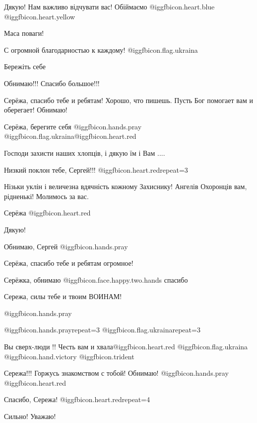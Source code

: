 \begin{itemize}
Дякую! Нам важливо відчувати вас! Обіймаємо @igg{fbicon.heart.blue}  @igg{fbicon.heart.yellow} 

Маса поваги!

С огромной благодарностью к каждому! @igg{fbicon.flag.ukraina}

Бережіть себе

Обнимаю!!! Спасибо большое!!!

Серёжа, спасибо тебе и ребятам! Хорошо, что пишешь. Пусть Бог помогает вам и оберегает! Обнимаю!

Серёжа, берегите себя  @igg{fbicon.hands.pray} @igg{fbicon.flag.ukraina}@igg{fbicon.heart.red}

Господи захисти наших хлопців, і дякую їм і Вам ....

Низкий поклон тебе, Сергей!!! @igg{fbicon.heart.red}{repeat=3}

Нізьки уклін і величезна вдячність кожному Захиснику! Ангелів Охоронців вам, рідненькі! Молимось за вас.

Серёжа @igg{fbicon.heart.red}

Дякую!

Обнимаю, Сергей  @igg{fbicon.hands.pray} 

Серёжа, спасибо тебе и ребятам огромное!

Серёжка, обнимаю  @igg{fbicon.face.happy.two.hands} спасибо

Сережа, силы тебе и твоим ВОИНАМ!

 @igg{fbicon.hands.pray} 

 @igg{fbicon.hands.pray}{repeat=3} @igg{fbicon.flag.ukraina}{repeat=3}

Вы сверх-люди !!
Честь вам и хвала@igg{fbicon.heart.red} @igg{fbicon.flag.ukraina}
@igg{fbicon.hand.victory} @igg{fbicon.trident} 

Сережа!!! Горжусь знакомством с тобой! Обнимаю! @igg{fbicon.hands.pray} @igg{fbicon.heart.red}

Спасибо, Сережа! @igg{fbicon.heart.red}{repeat=4}

Сильно! Уважаю!

\end{itemize} %
